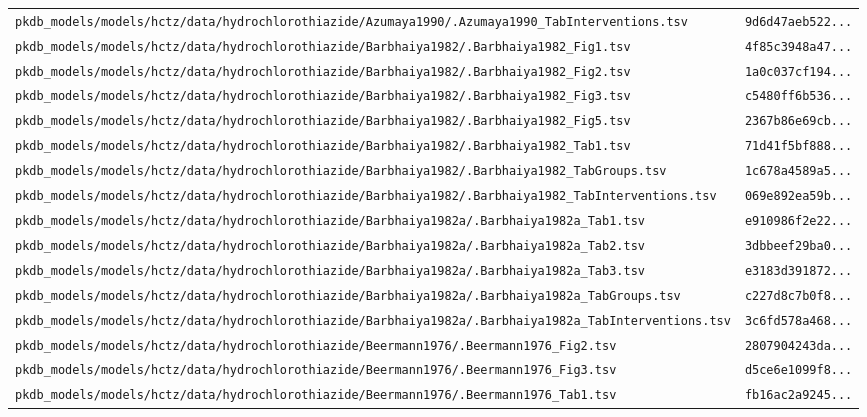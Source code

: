 \begin{longtable}{ll}
\texttt{pkdb\_models/models/hctz/data/hydrochlorothiazide/Azumaya1990/.Azumaya1990\_TabInterventions.tsv} & \texttt{9d6d47aeb522...} \\
\texttt{pkdb\_models/models/hctz/data/hydrochlorothiazide/Barbhaiya1982/.Barbhaiya1982\_Fig1.tsv} & \texttt{4f85c3948a47...} \\
\texttt{pkdb\_models/models/hctz/data/hydrochlorothiazide/Barbhaiya1982/.Barbhaiya1982\_Fig2.tsv} & \texttt{1a0c037cf194...} \\
\texttt{pkdb\_models/models/hctz/data/hydrochlorothiazide/Barbhaiya1982/.Barbhaiya1982\_Fig3.tsv} & \texttt{c5480ff6b536...} \\
\texttt{pkdb\_models/models/hctz/data/hydrochlorothiazide/Barbhaiya1982/.Barbhaiya1982\_Fig5.tsv} & \texttt{2367b86e69cb...} \\
\texttt{pkdb\_models/models/hctz/data/hydrochlorothiazide/Barbhaiya1982/.Barbhaiya1982\_Tab1.tsv} & \texttt{71d41f5bf888...} \\
\texttt{pkdb\_models/models/hctz/data/hydrochlorothiazide/Barbhaiya1982/.Barbhaiya1982\_TabGroups.tsv} & \texttt{1c678a4589a5...} \\
\texttt{pkdb\_models/models/hctz/data/hydrochlorothiazide/Barbhaiya1982/.Barbhaiya1982\_TabInterventions.tsv} & \texttt{069e892ea59b...} \\
\texttt{pkdb\_models/models/hctz/data/hydrochlorothiazide/Barbhaiya1982a/.Barbhaiya1982a\_Tab1.tsv} & \texttt{e910986f2e22...} \\
\texttt{pkdb\_models/models/hctz/data/hydrochlorothiazide/Barbhaiya1982a/.Barbhaiya1982a\_Tab2.tsv} & \texttt{3dbbeef29ba0...} \\
\texttt{pkdb\_models/models/hctz/data/hydrochlorothiazide/Barbhaiya1982a/.Barbhaiya1982a\_Tab3.tsv} & \texttt{e3183d391872...} \\
\texttt{pkdb\_models/models/hctz/data/hydrochlorothiazide/Barbhaiya1982a/.Barbhaiya1982a\_TabGroups.tsv} & \texttt{c227d8c7b0f8...} \\
\texttt{pkdb\_models/models/hctz/data/hydrochlorothiazide/Barbhaiya1982a/.Barbhaiya1982a\_TabInterventions.tsv} & \texttt{3c6fd578a468...} \\
\texttt{pkdb\_models/models/hctz/data/hydrochlorothiazide/Beermann1976/.Beermann1976\_Fig2.tsv} & \texttt{2807904243da...} \\
\texttt{pkdb\_models/models/hctz/data/hydrochlorothiazide/Beermann1976/.Beermann1976\_Fig3.tsv} & \texttt{d5ce6e1099f8...} \\
\texttt{pkdb\_models/models/hctz/data/hydrochlorothiazide/Beermann1976/.Beermann1976\_Tab1.tsv} & \texttt{fb16ac2a9245...} \\

\end{longtable}
